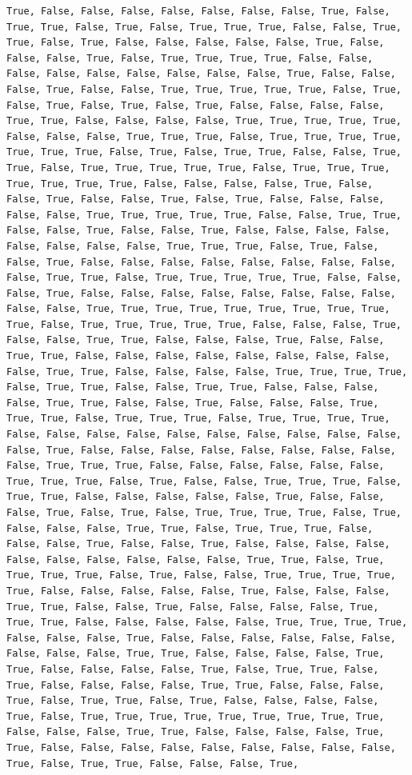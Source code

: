 \documentclass[
  letterpaper,
  DIV=11,
  numbers=noendperiod]{scrartcl}
\begin{document}
\begin{verbatim}
True, False, False, False, False, False, False, False, True, False, True, True, False, True, False, True, True, True, False, False, True, True, False, True, False, False, False, False, False, True, False, False, False, True, False, True, True, True, True, False, False, False, False, False, False, False, False, False, True, False, False, False, True, False, False, True, True, True, True, True, False, True, False, True, False, True, False, True, False, False, False, False, True, True, False, False, False, False, True, True, True, True, True, False, False, False, True, True, True, False, True, True, True, True, True, True, True, False, True, False, True, True, False, False, True, True, False, True, True, True, True, True, False, True, True, True, True, True, True, True, False, False, False, False, True, False, False, True, False, False, True, False, True, False, False, False, False, False, True, True, True, True, True, False, False, True, True, False, False, True, False, False, True, False, False, False, False, False, False, False, False, True, True, True, False, True, False, False, True, False, False, False, False, False, False, False, False, False, True, True, False, True, True, True, True, True, False, False, False, True, False, False, False, False, False, False, False, False, False, False, True, True, True, True, True, True, True, True, True, True, False, True, True, True, True, True, False, False, False, True, False, False, True, True, False, False, False, True, False, False, True, True, False, False, False, False, False, False, False, False, False, True, True, False, False, False, False, True, True, True, True, False, True, True, False, False, True, True, False, False, False, False, True, True, False, False, True, False, False, False, True, True, True, False, True, True, True, False, True, True, True, True, False, False, False, False, False, False, False, False, False, False, False, True, False, False, False, False, False, False, False, False, False, True, True, True, False, False, False, False, False, False, True, True, True, False, True, False, False, True, True, True, False, True, True, False, False, False, False, False, True, False, False, False, True, False, True, False, True, True, True, True, False, True, False, False, False, True, True, False, True, True, True, False, False, False, True, False, False, True, False, False, False, False, False, False, False, False, False, False, True, True, False, True, True, True, True, False, True, False, False, True, True, True, True, True, False, False, False, False, False, True, False, False, False, True, True, False, False, True, False, False, False, False, True, True, True, False, False, False, False, False, True, True, True, True, False, False, False, True, False, False, False, False, False, False, False, False, False, True, True, False, False, False, False, True, True, False, False, False, False, True, False, True, True, False, True, False, False, False, False, True, True, False, False, False, True, False, True, True, False, True, False, False, False, False, True, False, True, True, True, True, True, True, True, True, True, False, False, False, True, True, False, False, False, False, True, True, False, False, False, False, False, False, False, False, False, True, False, True, True, False, False, False, True, 
\end{verbatim}
\end{document}
